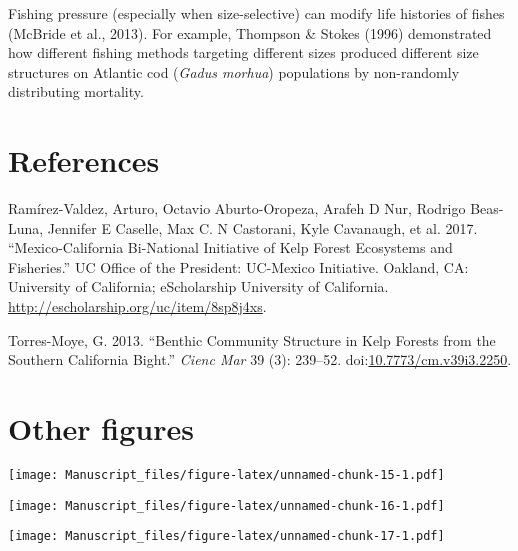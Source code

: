 \documentclass[12pt,]{article}
\begin{document}
Fishing pressure (especially when size-selective) can modify life
histories of fishes (McBride et al., 2013). For example, Thompson \&
Stokes (1996) demonstrated how different fishing methods targeting
different sizes produced different size structures on Atlantic cod
(\emph{Gadus morhua}) populations by non-randomly distributing
mortality.

\clearpage

\section{References}\label{references}

\hypertarget{refs}{}
\hypertarget{ref-ramrezvaldez_2017-RH}{}
Ramírez-Valdez, Arturo, Octavio Aburto-Oropeza, Arafeh D Nur, Rodrigo
Beas-Luna, Jennifer E Caselle, Max C. N Castorani, Kyle Cavanaugh, et
al. 2017. ``Mexico-California Bi-National Initiative of Kelp Forest
Ecosystems and Fisheries.'' UC Office of the President: UC-Mexico
Initiative. Oakland, CA: University of California; eScholarship
University of California.
\url{http://escholarship.org/uc/item/8sp8j4xs}.

\hypertarget{ref-torresmoye_2013-mx}{}
Torres-Moye, G. 2013. ``Benthic Community Structure in Kelp Forests from
the Southern California Bight.'' \emph{Cienc Mar} 39 (3): 239--52.
doi:\href{https://doi.org/10.7773/cm.v39i3.2250}{10.7773/cm.v39i3.2250}.

\section{Other figures}\label{other-figures}

\texttt{[image: Manuscript\_files/figure-latex/unnamed-chunk-15-1.pdf]}

\texttt{[image: Manuscript\_files/figure-latex/unnamed-chunk-16-1.pdf]}

\texttt{[image: Manuscript\_files/figure-latex/unnamed-chunk-17-1.pdf]}
\end{document}
